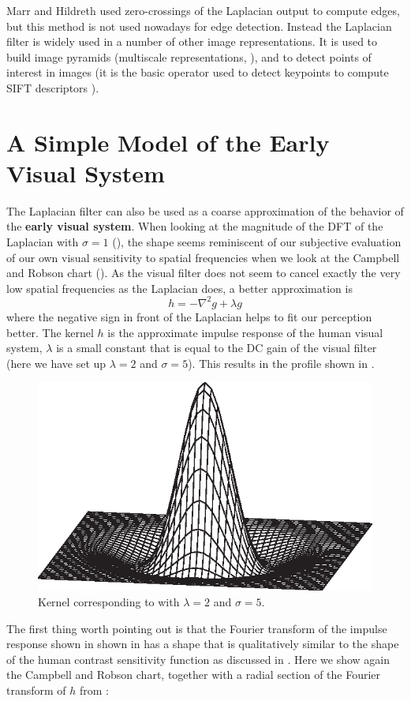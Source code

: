 Marr and Hildreth \cite{Marr80} used zero-crossings of the Laplacian output to compute edges, 
but this method is not used nowadays for edge detection. Instead the Laplacian filter is widely used in a number of other image representations. It is used to build image pyramids (multiscale representations, \chap{\ref{chapter:image_pyramids}}), and to detect points of interest in images (it is the basic operator used to detect keypoints to compute SIFT descriptors \cite{Lowe04}). 


\section{A Simple Model of the Early Visual System}

The Laplacian filter can also be used as a coarse approximation of the behavior of the {\bf early visual system}. When looking at the magnitude of the DFT of the Laplacian with $\sigma=1$ (\fig{\ref{fig:DFTlaplacians}}), the shape seems reminiscent of our subjective evaluation of our own visual sensitivity to spatial frequencies when we look at the Campbell and Robson chart (\fig{\ref{fig:csfchart}}). As the visual filter does not seem to cancel exactly the very low spatial frequencies as the Laplacian does, a better approximation is
\begin{equation}
h = -\nabla^2 g  + \lambda g
\label{eq:humanmodel}
\end{equation}
where the negative sign in front of the Laplacian helps to fit our perception better.
The kernel $h$ is the approximate impulse response of the human visual system, $\lambda$ is a small constant that is equal to the DC gain of the visual filter (here we have set up $\lambda = 2$ and $\sigma=5$). This results in the profile shown in \fig{\ref{fig:EVS_sigma5_lambda2}}.

\begin{figure}[h]
\centerline{
\includegraphics[width=.4\linewidth]{figures/derivatives/EVS_sigma5_lambda2.eps}}
\caption{Kernel corresponding to \eqn{\ref{eq:humanmodel}} with $\lambda = 2$ and $\sigma=5$.} 
\label{fig:EVS_sigma5_lambda2}
\end{figure}
The first thing worth pointing out is that the Fourier transform of the impulse response shown in shown in \fig{\ref{fig:EVS_sigma5_lambda2}} has a shape that is qualitatively similar to the shape of the human contrast sensitivity function as discussed in \chap{\ref{chapter:fourier_analysis}}. Here we show again the Campbell and Robson chart, together with a radial section of the Fourier transform of $h$ from \eqn{\ref{eq:humanmodel}}:

